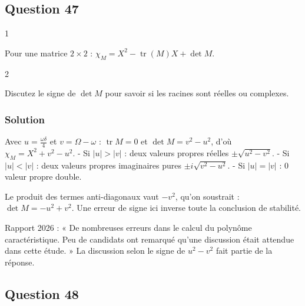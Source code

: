 \documentclass[11pt,a4paper]{article}
\begin{document}
\hypertarget{question-47}{%
\subsection{Question 47}\label{question-47}}

\begin{indication}{1}

Pour une matrice \(2\times2\) : \(\chi_M=X^2-\operatorname{tr}(M)X+\det M\).

\end{indication}

\begin{indication}{2}

Discutez le signe de \(\det M\) pour savoir si les racines sont réelles ou complexes.

\end{indication}

\hypertarget{solution-46}{%
\subsubsection{Solution}\label{solution-46}}

Avec \(u=\frac{\omega\delta}4\) et \(v=\Omega-\omega\) : \(\operatorname{tr}M=0\) et \(\det M=v^2-u^2\), d'où \(\chi_M=X^2+v^2-u^2\).
- Si \(|u|>|v|\) : deux valeurs propres réelles \(\pm\sqrt{u^2-v^2}\).
- Si \(|u|<|v|\) : deux valeurs propres imaginaires pures \(\pm i\sqrt{v^2-u^2}\).
- Si \(|u|=|v|\) : \(0\) valeur propre double.

\begin{piege}

Le produit des termes anti-diagonaux vaut \(-v^2\), qu'on soustrait : \(\det M=-u^2+v^2\). Une erreur de signe ici inverse toute la conclusion de stabilité.

\end{piege}

\begin{jury}

Rapport 2026 : « De nombreuses erreurs dans le calcul du polynôme caractéristique. Peu de candidats ont remarqué qu'une discussion était attendue dans cette étude. » La discussion selon le signe de \(u^2-v^2\) fait partie de la réponse.

\end{jury}

\hypertarget{question-48}{%
\subsection{Question 48}\label{question-48}}
\end{document}
